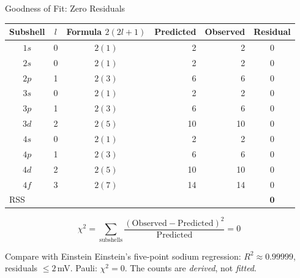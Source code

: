 \documentclass[aspectratio=169,12pt]{beamer}
\begin{document}
\begin{frame}[shrink=50]{Goodness of Fit: Zero Residuals}

\begin{center}
\renewcommand{\arraystretch}{1.2}
\begin{tabular}{cccrrc}
\toprule
Subshell & $l$ & Formula $2(2l+1)$ &
Predicted & Observed & Residual \\
\midrule
$1s$ & 0 & $2(1)$ &  2 &  2 & 0 \\
$2s$ & 0 & $2(1)$ &  2 &  2 & 0 \\
$2p$ & 1 & $2(3)$ &  6 &  6 & 0 \\
$3s$ & 0 & $2(1)$ &  2 &  2 & 0 \\
$3p$ & 1 & $2(3)$ &  6 &  6 & 0 \\
$3d$ & 2 & $2(5)$ & 10 & 10 & 0 \\
$4s$ & 0 & $2(1)$ &  2 &  2 & 0 \\
$4p$ & 1 & $2(3)$ &  6 &  6 & 0 \\
$4d$ & 2 & $2(5)$ & 10 & 10 & 0 \\
$4f$ & 3 & $2(7)$ & 14 & 14 & 0 \\
\midrule
\multicolumn{4}{l}{RSS} & & $\mathbf{0}$ \\
\bottomrule
\end{tabular}
\end{center}

\[
  \chi^2 = \sum_{\text{subshells}}
  \frac{(\text{Observed} - \text{Predicted})^2}{\text{Predicted}} = 0
\]

\begin{block}{Compare with Einstein}
Einstein's five-point sodium regression: $R^2 \approx 0.99999$,
residuals $\leq 2$\,mV.  Pauli: $\chi^2 = 0$.  The counts are
\emph{derived}, not \emph{fitted}.
\end{block}

\end{frame}
\end{document}

